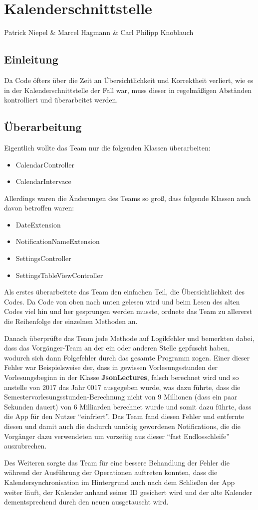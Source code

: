 \chapter{Kalenderschnittstelle}
Patrick Niepel \& Marcel Hagmann \& Carl Philipp Knoblauch

\section{Einleitung}
Da Code öfters über die Zeit an Übersichtlichkeit und Korrektheit verliert, wie es in der Kalenderschnittstelle der Fall war, muss dieser in regelmäßigen Abständen kontrolliert und überarbeitet werden.

\section{Überarbeitung}
Eigentlich wollte das Team nur die folgenden Klassen überarbeiten:
\begin{itemize}
\item CalendarController
\item CalendarIntervace
\end{itemize}

Allerdings waren die Änderungen des Teams so groß, dass folgende Klassen auch davon betroffen waren:
\begin{itemize}
\item DateExtension
\item NotificationNameExtension
\item SettingsController
\item SettingsTableViewController
\end{itemize}

Als erstes überarbeitete das Team den einfachen Teil, die Übersichtlichkeit des Codes. Da Code von oben nach unten gelesen wird und beim Lesen des alten Codes viel hin und her gesprungen werden musste, ordnete das Team zu allererst die Reihenfolge der einzelnen Methoden an.

Danach überprüfte das Team jede Methode auf Logikfehler und bemerkten dabei, dass das Vorgänger-Team an der ein oder anderen Stelle gepfuscht haben, wodurch sich dann Folgefehler durch das gesamte Programm zogen.
Einer dieser Fehler war Beispielsweise der, dass in gewissen Vorlesungsstunden der Vorlesungsbeginn in der Klasse \textbf{JsonLectures}, falsch berechnet wird und so anstelle von 2017 das Jahr 0017 ausgegeben wurde, was dazu führte, dass die Semestervorlesungsstunden-Berechnung nicht von 9 Millionen (dass ein paar Sekunden dauert) von 6 Milliarden berechnet wurde und somit dazu führte, dass die App für den Nutzer “einfriert”.
Das Team fand diesen Fehler und entfernte diesen und damit auch die dadurch unnötig gewordenen Notifications, die die Vorgänger dazu verwendeten um vorzeitig aus dieser “fast Endlosschleife” auszubrechen.

Des Weiteren sorgte das Team für eine bessere Behandlung der Fehler die während der Ausführung der Operationen auftreten konnten, dass die Kalendersynchronisation im Hintergrund auch nach dem Schließen der App weiter läuft, der Kalender anhand seiner ID gesichert wird und der alte Kalender dementsprechend durch den neuen ausgetauscht wird.
